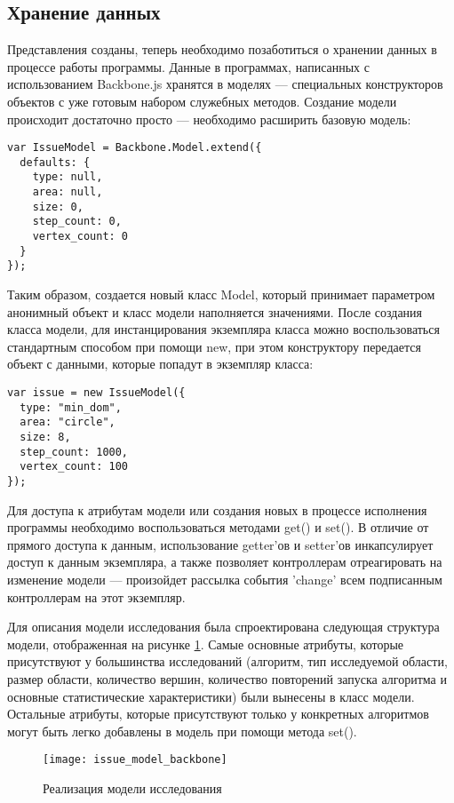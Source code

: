 \subsection{Хранение данных}

Представления созданы, теперь необходимо позаботиться о хранении данных в процессе работы программы. Данные в программах, написанных с использованием Backbone.js хранятся в моделях --- специальных конструкторов объектов с уже готовым набором служебных методов. Создание модели происходит достаточно просто --- необходимо расширить базовую модель:
\begin{lstlisting}
var IssueModel = Backbone.Model.extend({
  defaults: {
    type: null,
    area: null,
    size: 0,
    step_count: 0,
    vertex_count: 0
  }
});
\end{lstlisting}
Таким образом, создается новый класс Model, который принимает параметром анонимный объект и класс модели наполняется значениями. После создания класса модели, для инстанцирования экземпляра класса можно воспользоваться стандартным способом при помощи new, при этом конструктору передается объект с данными, которые попадут в экземпляр класса:
\begin{lstlisting}
var issue = new IssueModel({
  type: "min_dom",
  area: "circle",
  size: 8,
  step_count: 1000,
  vertex_count: 100
});
\end{lstlisting}
Для доступа к атрибутам модели или создания новых в процессе исполнения программы необходимо воспользоваться методами get() и set(). В отличие от прямого доступа к данным, использование getter'ов и setter'ов инкапсулирует доступ к данным экземпляра, а также позволяет контроллерам отреагировать на изменение модели --- произойдет рассылка события 'change' всем подписанным контроллерам на этот экземпляр.

Для описания модели исследования была спроектирована следующая структура модели, отображенная на рисунке \ref{issue_model_backbone}. Самые основные атрибуты, которые присутствуют у большинства исследований (алгоритм, тип исследуемой области, размер области, количество вершин, количество повторений запуска алгоритма и основные статистические характеристики) были вынесены в класс модели. Остальные атрибуты, которые присутствуют только у конкретных алгоритмов могут быть легко добавлены в модель при помощи метода set().

\begin{figure}[ht]
\center\texttt{[image: issue\_model\_backbone]}
\caption{Реализация модели исследования}\label{issue_model_backbone}
\end{figure}